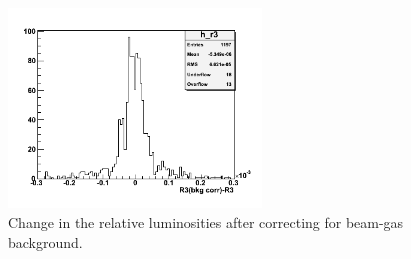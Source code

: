 \begin{figure}
  \begin{center}
    \includegraphics[width=0.6\textwidth]{figures/r-lumi-sys-bkg}
  \end{center}
  \caption{Change in the relative luminosities after correcting for beam-gas background.}
  \label{fig:r-lumi-sys-bkg}
\end{figure}

